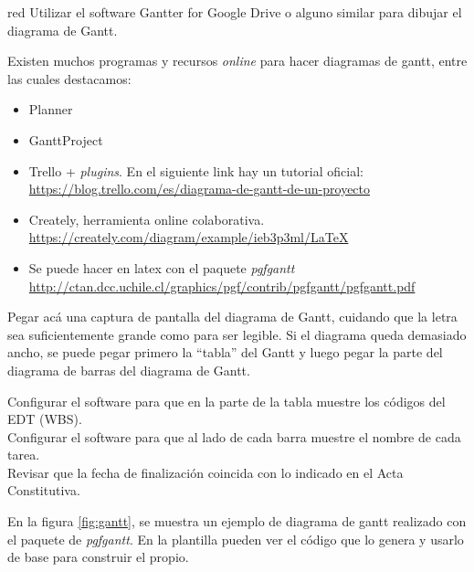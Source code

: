 \documentclass[11pt]{charter}
\begin{document}
\begin{consigna}{red}
Utilizar el software Gantter for Google Drive o alguno similar para dibujar el diagrama de Gantt.

Existen muchos programas y recursos \textit{online} para hacer diagramas de gantt, entre las cuales destacamos:

\begin{itemize}
\item Planner
\item GanttProject
\item Trello + \textit{plugins}. En el siguiente link hay un tutorial oficial: \\ \url{https://blog.trello.com/es/diagrama-de-gantt-de-un-proyecto}
\item Creately, herramienta online colaborativa. \\\url{https://creately.com/diagram/example/ieb3p3ml/LaTeX}
\item Se puede hacer en latex con el paquete \textit{pgfgantt}\\ \url{http://ctan.dcc.uchile.cl/graphics/pgf/contrib/pgfgantt/pgfgantt.pdf}
\end{itemize}

Pegar acá una captura de pantalla del diagrama de Gantt, cuidando que la letra sea suficientemente grande como para ser legible. 
Si el diagrama queda demasiado ancho, se puede pegar primero la ``tabla'' del Gantt y luego pegar la parte del diagrama de barras del diagrama de Gantt.

Configurar el software para que en la parte de la tabla muestre los códigos del EDT (WBS).\\
Configurar el software para que al lado de cada barra muestre el nombre de cada tarea.\\
Revisar que la fecha de finalización coincida con lo indicado en el Acta Constitutiva.

En la figura \ref{fig:gantt}, se muestra un ejemplo de diagrama de gantt realizado con el paquete de \textit{pgfgantt}. En la plantilla pueden ver el código que lo genera y usarlo de base para construir el propio.

\end{consigna}
\end{document}
